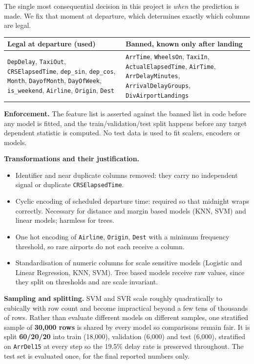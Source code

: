 \documentclass[11pt,a4paper]{article}
\newcommand{\metric}[1]{\textbf{\color{deep}#1}}
\begin{document}
The single most consequential decision in this project is \emph{when} the prediction is
made. We fix that moment at departure, which determines exactly which columns are legal.

\begin{center}
\small
\begin{tabular}{@{}p{7.0cm} p{7.6cm}@{}}
\toprule
\textbf{Legal at departure (used)} & \textbf{Banned, known only after landing} \\
\midrule
\texttt{DepDelay}, \texttt{TaxiOut}, \texttt{CRSElapsedTime},
\texttt{dep\_sin}, \texttt{dep\_cos}, \texttt{Month}, \texttt{DayofMonth},
\texttt{DayOfWeek}, \texttt{is\_weekend}, \texttt{Airline}, \texttt{Origin},
\texttt{Dest}
&
\texttt{ArrTime}, \texttt{WheelsOn}, \texttt{TaxiIn},
\texttt{ActualElapsedTime}, \texttt{AirTime}, \texttt{ArrDelayMinutes},
\texttt{ArrivalDelayGroups}, \texttt{DivAirportLandings} \\
\bottomrule
\end{tabular}
\end{center}

\textbf{Enforcement.} The feature list is asserted against the banned list in code before
any model is fitted, and the train/validation/test split happens before any target
dependent statistic is computed. No test data is used to fit scalers, encoders or models.

\textbf{Transformations and their justification.}
\begin{itemize}
  \item Identifier and near duplicate columns removed: they carry no independent signal
        or duplicate \texttt{CRSElapsedTime}.
  \item Cyclic encoding of scheduled departure time: required so that midnight wraps
        correctly. Necessary for distance and margin based models (KNN, SVM) and linear
        models; harmless for trees.
  \item One hot encoding of \texttt{Airline}, \texttt{Origin}, \texttt{Dest} with a
        minimum frequency threshold, so rare airports do not each receive a column.
  \item Standardisation of numeric columns for scale sensitive models (Logistic and
        Linear Regression, KNN, SVM). Tree based models receive raw values, since they
        split on thresholds and are scale invariant.
\end{itemize}

\textbf{Sampling and splitting.} SVM and SVR scale roughly quadratically to cubically
with row count and become impractical beyond a few tens of thousands of rows. Rather
than evaluate different models on different samples, one stratified sample of
\metric{30{,}000 rows} is shared by every model so comparisons remain fair. It is split
\metric{60/20/20} into train (18,000), validation (6,000) and test (6,000), stratified
on \texttt{ArrDel15} at every step so the 19.5\% delay rate is preserved throughout. The
test set is evaluated once, for the final reported numbers only.
\end{document}
